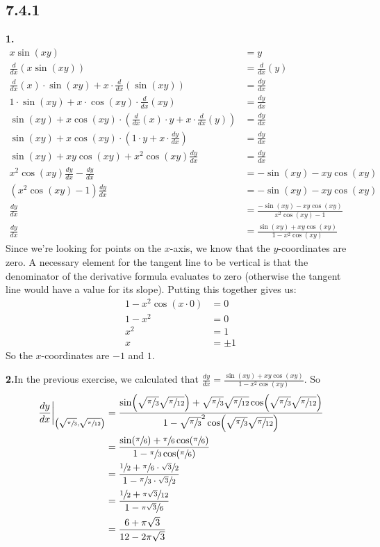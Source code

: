 \documentclass[10pt,oneside,]{book}
\theoremstyle{plain}
\theoremstyle{definition}
\numberwithin{equation}{section}
\newcommand{\fe}[2]{#1\mathopen{}\left(#2\right)\mathclose{}}
\newcommand{\point}[2]{\left(#1,#2\right)}
\newcommand{\lz}[2]{\frac{d#1}{d#2}}
\newcommand{\lzoo}[2]{{\frac{d}{d#1}}{\left(#2\right)}}
\newcommand{\lzoa}[3]{\left.{\frac{d#1}{d#2}}\right|_{#3}}
\begin{document}
\subsection*{7.4.1 }
\noindent\textbf{1.}\quad{}\begin{align*}
x\fe{\sin}{xy}&=y\\
\lzoo{x}{x\fe{\sin}{xy}}&=\lzoo{x}{y}\\
\lzoo{x}{x}\cdot\fe{\sin}{xy}+x\cdot\lzoo{x}{\fe{\sin}{xy}}&=\lz{y}{x}\\
1\cdot\fe{\sin}{xy}+x\cdot\fe{\cos}{xy}\cdot\lzoo{x}{xy}&=\lz{y}{x}\\
\fe{\sin}{xy}+x\fe{\cos}{xy}\cdot\left(\lzoo{x}{x}\cdot y+x\cdot\lzoo{x}{y}\right)&=\lz{y}{x}\\
\fe{\sin}{xy}+x\fe{\cos}{xy}\cdot\left(1\cdot y+x\cdot\lz{y}{x}\right)&=\lz{y}{x}\\
\fe{\sin}{xy}+xy\fe{\cos}{xy}+x^2\fe{\cos}{xy}\lz{y}{x}&=\lz{y}{x}\\
x^2\fe{\cos}{xy}\lz{y}{x}-\lz{y}{x}&=-\fe{\sin}{xy}-xy\fe{\cos}{xy}\\
\left(x^2\fe{\cos}{xy}-1\right)\lz{y}{x}&=-\fe{\sin}{xy}-xy\fe{\cos}{xy}\\
\lz{y}{x}&=\frac{-\fe{\sin}{xy}-xy\fe{\cos}{xy}}{x^2\fe{\cos}{xy}-1}\\
\lz{y}{x}&=\frac{\fe{\sin}{xy}+xy\fe{\cos}{xy}}{1-x^2\fe{\cos}{xy}}
\end{align*}Since we're looking for points on the \(x\)-axis, we know that the \(y\)-coordinates are zero.  A necessary element for the tangent line to be vertical is that the denominator of the derivative formula evaluates to zero (otherwise the tangent line would have a value for its slope).  Putting this together gives us:\begin{align*}
1-x^2\fe{\cos}{x\cdot0}&=0\\
1-x^2&=0\\
x^2&=1\\
x&=\pm1
\end{align*}So the \(x\)-coordinates are \(-1\) and \(1\).%
\par\smallskip
\noindent\textbf{2.}\quad{}In the previous exercise, we calculated that \(\lz{y}{x}=\frac{\fe{\sin}{xy}+xy\fe{\cos}{xy}}{1-x^2\fe{\cos}{xy}}\). So \begin{align*}
\lzoa{y}{x}{\point{\sqrt{\sfrac{\pi}{3}}}{\sqrt{\sfrac{\pi}{12}}}}&=\frac{\fe{\sin}{\sqrt{\sfrac{\pi}{3}}\sqrt{\sfrac{\pi}{12}}}+\sqrt{\sfrac{\pi}{3}}\sqrt{\sfrac{\pi}{12}}\fe{\cos}{\sqrt{\sfrac{\pi}{3}}\sqrt{\sfrac{\pi}{12}}}}{1-\sqrt{\sfrac{\pi}{3}}^2\fe{\cos}{\sqrt{\sfrac{\pi}{3}}\sqrt{\sfrac{\pi}{12}}}}\\
&=\frac{\fe{\sin}{\sfrac{\pi}{6}}+\sfrac{\pi}{6}\fe{\cos}{\sfrac{\pi}{6}}}{1-\sfrac{\pi}{3}\fe{\cos}{\sfrac{\pi}{6}}}\\
&=\frac{\sfrac{1}{2}+\sfrac{\pi}{6}\cdot\sfrac{\sqrt{3}}{2}}{1-\sfrac{\pi}{3}\cdot\sfrac{\sqrt{3}}{2}}\\
&=\frac{\sfrac{1}{2}+\sfrac{\pi\sqrt{3}}{12}}{1-\sfrac{\pi\sqrt{3}}{6}}\\
&=\frac{6+\pi\sqrt{3}}{12-2\pi\sqrt{3}}
\end{align*}%
\end{document}
